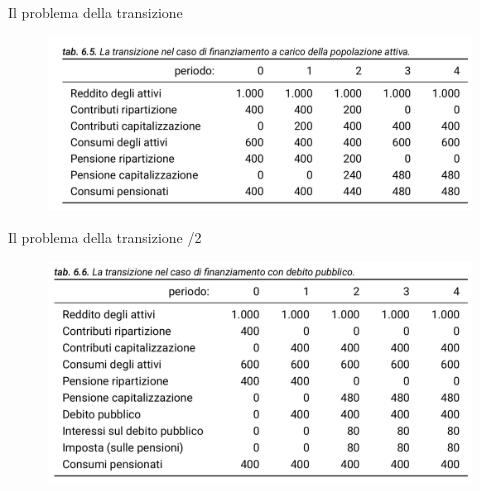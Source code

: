 \documentclass[11pt]{beamer}
\begin{document}
\begin{frame}{Il problema della transizione}
\begin{figure}[htbp]
\centering
\includegraphics[width=\textwidth]{./figure/transizione-alla-capitalizzazione-1.png}
\end{figure}
\end{frame}


\begin{frame}{Il problema della transizione /2}
\begin{figure}[htbp]
\centering
\includegraphics[width=\textwidth]{./figure/transizione-alla-capitalizzazione-2.png}
\end{figure}
\end{frame}
\end{document}
